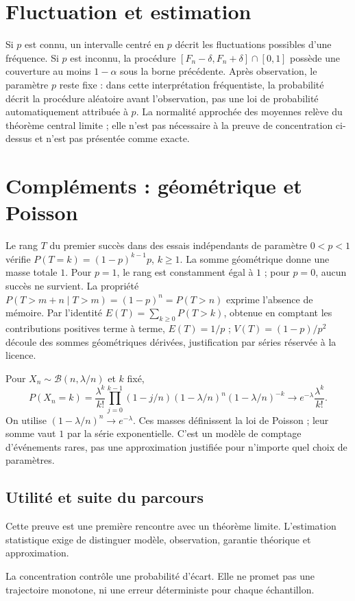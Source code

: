 \documentclass[../cours_tle.tex]{subfiles}
\begin{document}
\section{Fluctuation et estimation}
Si $p$ est connu, un intervalle centré en $p$ décrit les fluctuations possibles d'une fréquence. Si $p$ est inconnu, la procédure $[F_n-\delta,F_n+\delta]\cap[0,1]$ possède une couverture au moins $1-\alpha$ sous la borne précédente.
Après observation, le paramètre $p$ reste fixe : dans cette interprétation fréquentiste, la probabilité décrit la procédure aléatoire avant l'observation, pas une loi de probabilité automatiquement attribuée à $p$.
La normalité approchée des moyennes relève du théorème central limite ; elle n'est pas nécessaire à la preuve de concentration ci-dessus et n'est pas présentée comme exacte.
\section{Compléments : géométrique et Poisson}
Le rang $T$ du premier succès dans des essais indépendants de paramètre $0<p<1$ vérifie $P(T=k)=(1-p)^{k-1}p$, $k\ge1$. La somme géométrique donne une masse totale $1$. Pour $p=1$, le rang est constamment égal à $1$ ; pour $p=0$, aucun succès ne survient.
La propriété $P(T>m+n\mid T>m)=(1-p)^n=P(T>n)$ exprime l'absence de mémoire.
Par l'identité $E(T)=\sum_{k\ge0}P(T>k)$, obtenue en comptant les contributions positives terme à terme, $E(T)=1/p$ ; $V(T)=(1-p)/p^2$ découle des sommes géométriques dérivées, justification par séries réservée à la licence.

Pour $X_n\sim\mathcal B(n,\lambda/n)$ et $k$ fixé,
\[
P(X_n=k)=\frac{\lambda^k}{k!}\prod_{j=0}^{k-1}(1-j/n)(1-\lambda/n)^n(1-\lambda/n)^{-k}
\longrightarrow e^{-\lambda}\frac{\lambda^k}{k!}.
\]
On utilise $(1-\lambda/n)^n\to e^{-\lambda}$. Ces masses définissent la loi de Poisson ; leur somme vaut $1$ par la série exponentielle. C'est un modèle de comptage d'événements rares, pas une approximation justifiée pour n'importe quel choix de paramètres.
\begin{finchapitre}
\section{Utilité et suite du parcours}
Cette preuve est une première rencontre avec un théorème limite. L'estimation statistique exige de distinguer modèle, observation, garantie théorique et approximation.
\begin{retenir}
La concentration contrôle une probabilité d'écart. Elle ne promet pas une trajectoire monotone, ni une erreur déterministe pour chaque échantillon.
\end{retenir}
\end{finchapitre}
\end{document}
